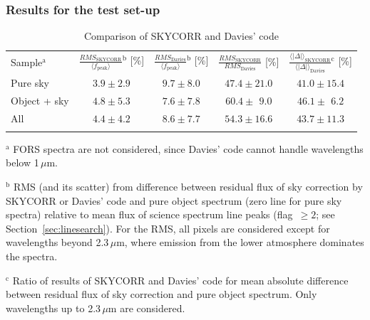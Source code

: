 \subsubsection{Results for the test set-up}\label{sec:restest}
\begin{table}
\caption[]{Comparison of SKYCORR and Davies' code}
\label{tab:davies}
\centering
\vspace{5pt}
\begin{tabular}{l c c c c}
\hline\hline
\noalign{\smallskip}
Sample$^\mathrm{a}$ &
$\frac{RMS_\mathrm{SKYCORR}}{\langle f_\mathrm{peak} \rangle}$$^\mathrm{b}$ [\%] &
$\frac{RMS_\mathrm{Davies}}{\langle f_\mathrm{peak} \rangle}$$^\mathrm{b}$ [\%] &
$\frac{RMS_\mathrm{SKYCORR}}{RMS_\mathrm{Davies}}$ [\%] &
$\frac{\langle|\Delta|\rangle_\mathrm{SKYCORR}}
{\langle|\Delta|\rangle_\mathrm{Davies}}$$^\mathrm{c}$ [\%] \\
\noalign{\smallskip}
\hline
\noalign{\smallskip}
Pure sky & $3.9 \pm 2.9$ & $9.7 \pm 8.0$ & $47.4 \pm 21.0$ & $41.0 \pm 15.4$ \\
Object + sky & $4.8 \pm 5.3$ & $7.6 \pm 7.8$ & $60.4 \pm \ \, 9.0$ &
$46.1 \pm \ \, 6.2$ \\
All & $4.4 \pm 4.2$ & $8.6 \pm 7.7$ & $54.3 \pm 16.6$ & $43.7 \pm 11.3$ \\
\noalign{\smallskip}
\hline
\end{tabular}
\footnotesize
\begin{list}{}{}
\item[$^\mathrm{a}$] FORS spectra are not considered, since Davies' code cannot
handle wavelengths below 1\,$\mu$m.
\item[$^\mathrm{b}$] RMS (and its scatter) from difference between residual
flux of sky correction by SKYCORR or Davies' code and pure object spectrum
(zero line for pure sky spectra) relative to mean flux of science spectrum line
peaks (flag~$\ge 2$; see Section~\ref{sec:linesearch}). For the RMS, all
pixels are considered except for wavelengths beyond 2.3\,$\mu$m, where emission
from the lower atmosphere dominates the spectra.
\item[$^\mathrm{c}$] Ratio of results of SKYCORR and Davies' code for mean
absolute difference between residual flux of sky correction and pure object
spectrum. Only wavelengths up to 2.3\,$\mu$m are considered.
\end{list}
\end{table}

